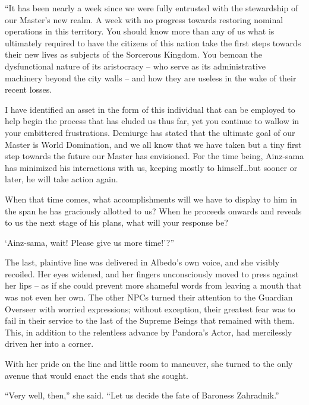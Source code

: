  

“It has been nearly a week since we were fully entrusted with the stewardship of our Master’s new realm. A week with no progress towards restoring nominal operations in this territory. You should know more than any of us what is ultimately required to have the citizens of this nation take the first steps towards their new lives as subjects of the Sorcerous Kingdom. You bemoan the dysfunctional nature of its aristocracy – who serve as its administrative machinery beyond the city walls – and how they are useless in the wake of their recent losses.

 

I have identified an asset in the form of this individual that can be employed to help begin the process that has eluded us thus far, yet you continue to wallow in your embittered frustrations. Demiurge has stated that the ultimate goal of our Master is World Domination, and we all know that we have taken but a tiny first step towards the future our Master has envisioned. For the time being, Ainz-sama has minimized his interactions with us, keeping mostly to himself…but sooner or later, he will take action again.

 

When that time comes, what accomplishments will we have to display to him in the span he has graciously allotted to us? When he proceeds onwards and reveals to us the next stage of his plans, what will your response be?

 

‘Ainz-sama, wait! Please give us more time!’?”

 

The last, plaintive line was delivered in Albedo’s own voice, and she visibly recoiled. Her eyes widened, and her fingers unconsciously moved to press against her lips – as if she could prevent more shameful words from leaving a mouth that was not even her own. The other NPCs turned their attention to the Guardian Overseer with worried expressions; without exception, their greatest fear was to fail in their service to the last of the Supreme Beings that remained with them. This, in addition to the relentless advance by Pandora’s Actor, had mercilessly driven her into a corner.

 

With her pride on the line and little room to maneuver, she turned to the only avenue that would enact the ends that she sought.

 

“Very well, then,” she said. “Let us decide the fate of Baroness Zahradnik.”

